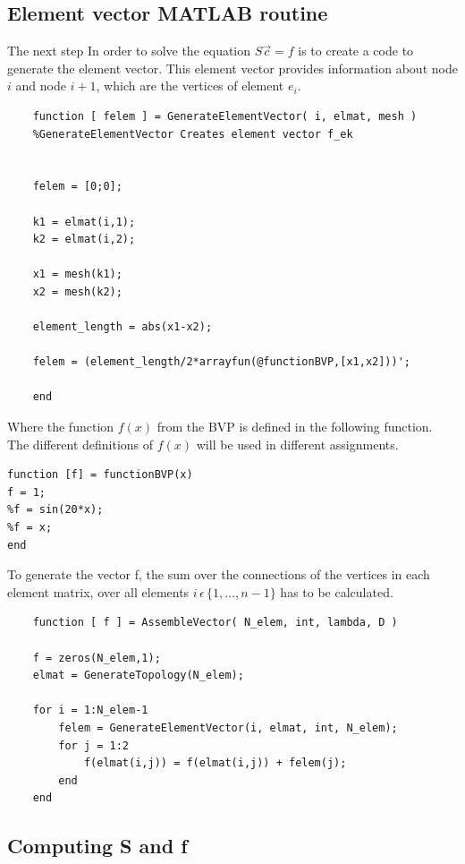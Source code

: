 \documentclass[a4paper]{report}
\begin{document}
\subsection{Element vector MATLAB routine}

The next step In order to solve the equation $S\vec{c}=f$ is to create a code to generate the element vector. This element vector provides information about node $i$ and node $i+1$, which are the vertices of element $e_i$.\\



\begin{lstlisting}
	function [ felem ] = GenerateElementVector( i, elmat, mesh )
	%GenerateElementVector Creates element vector f_ek
	
	
	felem = [0;0];
	
	k1 = elmat(i,1);
	k2 = elmat(i,2);
	
	x1 = mesh(k1);
	x2 = mesh(k2);
	
	element_length = abs(x1-x2);
	
	felem = (element_length/2*arrayfun(@functionBVP,[x1,x2]))';
	
	end
\end{lstlisting}

Where the function $f(x)$ from the BVP is defined in the following function. The different definitions of $f(x)$ will be used in different assignments.

\begin{lstlisting}
function [f] = functionBVP(x)
f = 1;
%f = sin(20*x);
%f = x;
end
\end{lstlisting}

\smallskip

To generate the vector f, the sum over the connections of the vertices in each element matrix, over all elements $i\,\epsilon\, \{1,...,n-1\}$  has to be calculated. 

\bigskip

	
\begin{lstlisting}
	function [ f ] = AssembleVector( N_elem, int, lambda, D )
		
	f = zeros(N_elem,1);
	elmat = GenerateTopology(N_elem);
		
	for i = 1:N_elem-1
		felem = GenerateElementVector(i, elmat, int, N_elem);
		for j = 1:2
			f(elmat(i,j)) = f(elmat(i,j)) + felem(j);
		end
	end
\end{lstlisting}	




\subsection{Computing S and f}
\end{document}
